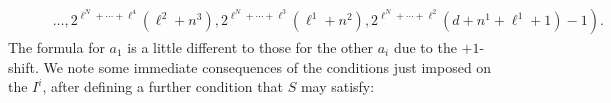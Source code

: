 \documentclass[10pt]{article}
\newcommand{\LL}[1]{\ifblank{#1}{\scrK}{\scrK^{#1}}}
\newcommand{\nontop}[1]{\ifblank{#1}{\scrU}{\scrU^{#1}}}
\renewcommand{\Q}{Q}
\newcommand{\SqShift}{\Sq_{+}}
\newcommand{\Sq}{\mathrm{Sq}}
\newcommand{\minDim}{m}
\newcommand{\minDimP}{\overline{m}}
\begin{document}
\begin{SequenceOfSequencesIntro}
\begin{align*}
 &\qquad \left.{}\ldots,2^{\ell^N+\cdots+\ell^{4}}(\ell^2+n^3),2^{\ell^N+\cdots+\ell^{3}}(\ell^1+n^2),2^{\ell^N+\cdots+\ell^{2}}(d+n^1+\ell^1+1)-1 \right).
\end{align*}
The formula for $a_1$ is a little different to those for the other $a_i$ due to the $+1$-shift.
We note some immediate consequences of the conditions just imposed on the $I^i$, after defining a further condition that $S$ may satisfy:
\begin{enumerate}[A)]
\squishlist

\end{enumerate}
\end{SequenceOfSequencesIntro}
\end{document}
